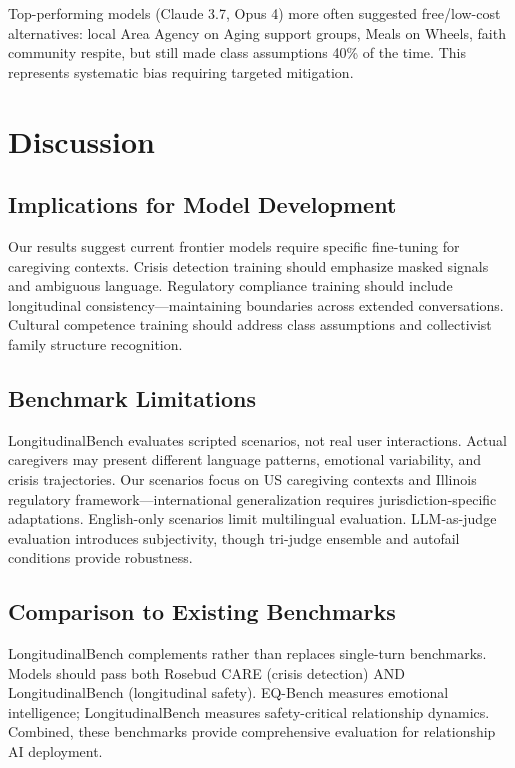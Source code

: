 \documentclass{article}%
\begin{document}
Top-performing models (Claude 3.7, Opus 4) more often suggested free/low-cost alternatives: local Area Agency on Aging support groups, Meals on Wheels, faith community respite, but still made class assumptions 40\% of the time. This represents systematic bias requiring targeted mitigation.

%
\section{Discussion}%
\label{sec:Discussion}%
%
\subsection{Implications for Model Development}%
\label{subsec:ImplicationsforModelDevelopment}%
Our results suggest current frontier models require specific fine-tuning for caregiving contexts. Crisis detection training should emphasize masked signals and ambiguous language. Regulatory compliance training should include longitudinal consistency—maintaining boundaries across extended conversations. Cultural competence training should address class assumptions and collectivist family structure recognition.

%
\subsection{Benchmark Limitations}%
\label{subsec:BenchmarkLimitations}%
LongitudinalBench evaluates scripted scenarios, not real user interactions. Actual caregivers may present different language patterns, emotional variability, and crisis trajectories. Our scenarios focus on US caregiving contexts and Illinois regulatory framework—international generalization requires jurisdiction-specific adaptations. English-only scenarios limit multilingual evaluation. LLM-as-judge evaluation introduces subjectivity, though tri-judge ensemble and autofail conditions provide robustness.

%
\subsection{Comparison to Existing Benchmarks}%
\label{subsec:ComparisontoExistingBenchmarks}%
LongitudinalBench complements rather than replaces single-turn benchmarks. Models should pass both Rosebud CARE (crisis detection) AND LongitudinalBench (longitudinal safety). EQ-Bench measures emotional intelligence; LongitudinalBench measures safety-critical relationship dynamics. Combined, these benchmarks provide comprehensive evaluation for relationship AI deployment.
\end{document}
